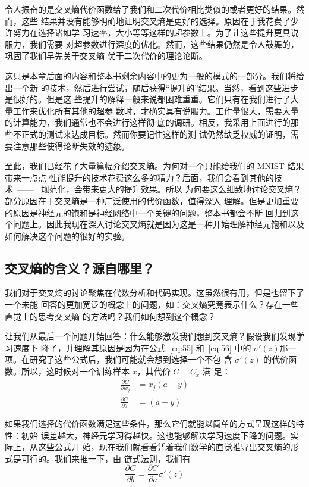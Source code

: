 令人振奋的是交叉熵代价函数给了我们和二次代价相比类似的或者更好的结果。然而，这些
结果并没有能够明确地证明交叉熵是更好的选择。原因在于我花费了少许努力在选择诸如学
习速率，\minibatch{}大小等等这样的超参数上。为了让这些提升更具说服力，我们需要
对超参数进行深度的优化。然而，这些结果仍然是令人鼓舞的，巩固了我们早先关于交叉熵
优于二次代价的理论论断。

这只是本章后面的内容和整本书剩余内容中的更为一般的模式的一部分。我们将给出一个新
的技术，然后进行尝试，随后获得“提升的”结果。当然，看到这些进步是很好的。但是这
些提升的解释一般来说都困难重重。它们只有在我们进行了大量工作来优化所有其他的超参
数时，才确实具有说服力。工作量很大，需要大量的计算能力，我们通常也不会进行这样彻
底的调研。相反，我采用上面进行的那些不正式的测试来达成目标。然而你要记住这样的测
试仍然缺乏权威的证明，需要注意那些使得论断失效的迹象。

至此，我们已经花了大量篇幅介绍交叉熵。为何对一个只能给我们的 MNIST 结果带来一点点
性能提升的技术花费这么多的精力？后面，我们会看到其他的技术~——~
\hyperref[sec:overfitting_and_regularization]{规范化}，会带来更大的提升效果。所以
为何要这么细致地讨论交叉熵？部分原因在于交叉熵是一种广泛使用的代价函数，值得深入
理解。但是更加重要的原因是神经元的饱和是神经网络中一个关键的问题，整本书都会不断
回归到这个问题上。因此我现在深入讨论交叉熵就是因为这是一种开始理解神经元饱和以及
如何解决这个问题的很好的实验。

\subsection{交叉熵的含义？源自哪里？}

我们对于交叉熵的讨论聚焦在代数分析和代码实现。这虽然很有用，但是也留下了一个未能
回答的更加宽泛的概念上的问题，如：交叉熵究竟表示什么？存在一些直觉上的思考交叉熵
的方法吗？我们如何想到这个概念？

让我们从最后一个问题开始回答：什么能够激发我们想到交叉熵？假设我们发现学习速度下
降了，并理解其原因是因为在公式~\eqref{eq:55} 和~\eqref{eq:56} 中的
$\sigma'(z)$那一项。在研究了这些公式后，我们可能就会想到选择一个不包
含 $\sigma'(z)$ 的代价函数。所以，这时候对一个训练样本 $x$，其代价 $C = C_x$ 满
足：
\begin{align}
  \frac{\partial C}{\partial w_j} &= x_j(a-y) \label{eq:71}\tag{71}\\
  \frac{\partial C}{\partial b } &= (a-y) \label{eq:72}\tag{72}
\end{align}

如果我们选择的代价函数满足这些条件，那么它们就能以简单的方式呈现这样的特性：初始
误差越大，神经元学习得越快。这也能够解决学习速度下降的问题。实际上，从这些公式开
始，现在我们就看看凭着我们数学的直觉推导出交叉熵的形式是可行的。我们来推一下，由
链式法则，我们有
\begin{equation}
  \frac{\partial C}{\partial b} = \frac{\partial C}{\partial a}
  \sigma'(z)
  \tag{73}
\end{equation}


